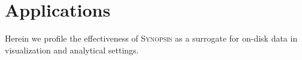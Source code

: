 \section{Applications}
\label{sec:applications}
Herein we profile the effectiveness of \textsc{Synopsis} as a surrogate for on-disk data in visualization and analytical settings.



